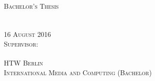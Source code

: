 
\thispagestyle{empty}


\begin{center}

\vspace*{2cm}
\Large
\textsc{\thesistitle}\\

\vspace{3cm}

\textsc{Bachelor's Thesis\\[0.5\baselineskip]
\thesisauthor\\
\matrikelnr}\\


\vspace{2.5cm}
\textsc{16 August 2016}\\

\vspace{1cm}
\textsc{Supervisor:\\
\firstsupervisor}\\

\vspace{0.5cm}
\textsc{HTW Berlin\\
International Media and Computing (Bachelor)}

\end{center}

\addtocounter{page}{-1}